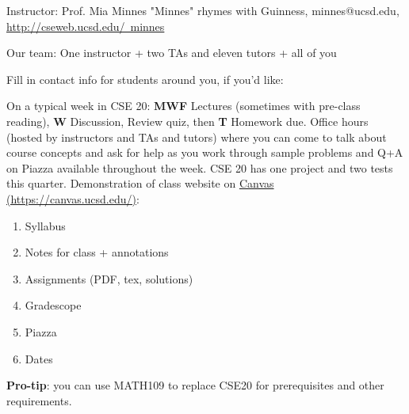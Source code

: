 Instructor: Prof. Mia Minnes {\tiny{"Minnes" rhymes with Guinness}}, minnes@ucsd.edu, 
\href{http://cseweb.ucsd.edu/~minnes}{http://cseweb.ucsd.edu/~minnes}


Our team: One instructor + two TAs and eleven tutors + all of you

Fill in contact info for students around you, if you'd like:

\vfill


On a typical week in CSE 20: {\bf MWF} Lectures (sometimes with pre-class reading), {\bf W} Discussion,
Review quiz, then {\bf T} Homework due.
Office hours (hosted by instructors and TAs and tutors) where you can come to talk 
about course concepts and ask for help as you work through sample problems 
and Q+A on Piazza available throughout the week. CSE 20 has one project and two tests
this quarter.
Demonstration of class website on \href{https://canvas.ucsd.edu/}{Canvas (https://canvas.ucsd.edu/)}:
\begin{enumerate}
\item Syllabus
\item Notes for class + annotations
\item Assignments (PDF, tex, solutions)
\item Gradescope
\item Piazza
\item Dates
\end{enumerate}

\vfill
\begin{comment}
There are lots of great reasons to have a laptop, tablet, or phone open during class. You might be taking notes, 
getting a photo of an important moment on the board, trying out a construction that we're developing together, working 
on the review quiz, and so on. 
The main issue with screens and technology in the classroom isn't that they might 
distract you, 
it's the distraction of other students. We ask that if you would like to use
a device in class and may have 
have unrelated content open, please sit in one of the back two rows of the 
room so that it's not adversely affecting other students.


\vfill
\end{comment}
{\bf Pro-tip}: you can use MATH109 to replace CSE20 for prerequisites and other requirements.

\vfill

